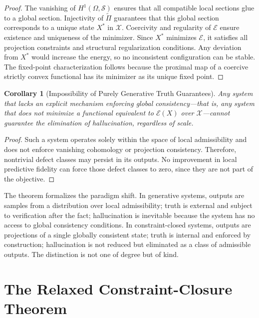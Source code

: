 \documentclass[11pt, oneside]{article}
\newtheorem{corollary}{Corollary}
\begin{document}
\begin{proof}
The vanishing of $H^1(\Omega, \mathcal{S})$ ensures that all compatible local sections glue to a global section. Injectivity of $\tilde{\Pi}$ guarantees that this global section corresponds to a unique state $X^\ast$ in $\mathcal{X}$. Coercivity and regularity of $\mathcal{E}$ ensure existence and uniqueness of the minimizer. Since $X^\ast$ minimizes $\mathcal{E}$, it satisfies all projection constraints and structural regularization conditions. Any deviation from $X^\ast$ would increase the energy, so no inconsistent configuration can be stable. The fixed-point characterization follows because the proximal map of a coercive strictly convex functional has its minimizer as its unique fixed point.
\end{proof}

\begin{corollary}[Impossibility of Purely Generative Truth Guarantees]
Any system that lacks an explicit mechanism enforcing global consistency---that is, any system that does not minimize a functional equivalent to $\mathcal{E}(X)$ over $\mathcal{X}$---cannot guarantee the elimination of hallucination, regardless of scale.
\end{corollary}

\begin{proof}
Such a system operates solely within the space of local admissibility and does not enforce vanishing cohomology or projection consistency. Therefore, nontrivial defect classes may persist in its outputs. No improvement in local predictive fidelity can force those defect classes to zero, since they are not part of the objective.
\end{proof}

The theorem formalizes the paradigm shift. In generative systems, outputs are samples from a distribution over local admissibility; truth is external and subject to verification after the fact; hallucination is inevitable because the system has no access to global consistency conditions. In constraint-closed systems, outputs are projections of a single globally consistent state; truth is internal and enforced by construction; hallucination is not reduced but eliminated as a class of admissible outputs. The distinction is not one of degree but of kind.

\section{The Relaxed Constraint-Closure Theorem}
\end{document}
